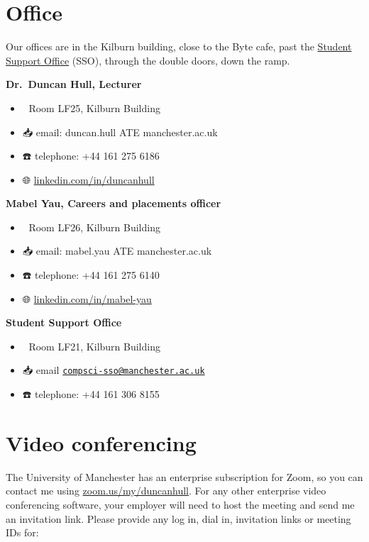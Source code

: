 \documentclass[
  12pt,
]{book}
\providecommand{\tightlist}{%
  \setlength{\itemsep}{0pt}\setlength{\parskip}{0pt}}
\begin{document}
\hypertarget{office}{%
\section{Office}\label{office}}

Our offices are in the Kilburn building, close to the Byte cafe, past the \href{https://studentnet.cs.manchester.ac.uk/student-services/}{Student Support Office} (SSO), through the double doors, down the ramp.

\textbf{Dr.~Duncan Hull, Lecturer} 👨‍💻

\begin{itemize}
\tightlist
\item
  🏢 Room LF25, Kilburn Building
\item
  📥 email: duncan.hull ATE manchester.ac.uk
\item
  ☎️ telephone: +44 161 275 6186
\item
  🌐 \href{https://uk.linkedin.com/in/duncanhull}{linkedin.com/in/duncanhull}
\end{itemize}

\textbf{Mabel Yau, Careers and placements officer} 👩‍💻

\begin{itemize}
\tightlist
\item
  🏢 Room LF26, Kilburn Building
\item
  📥 email: mabel.yau ATE manchester.ac.uk
\item
  ☎️ telephone: +44 161 275 6140
\item
  🌐 \href{https://uk.linkedin.com/in/mabel-yau}{linkedin.com/in/mabel-yau}
\end{itemize}

\textbf{Student Support Office } 👨‍👩‍👧‍👦

\begin{itemize}
\tightlist
\item
  🏢 Room LF21, Kilburn Building
\item
  📥 email \href{mailto:compsci-sso@manchester.ac.uk}{\nolinkurl{compsci-sso@manchester.ac.uk}}
\item
  ☎️ telephone: +44 161 306 8155
\end{itemize}

\hypertarget{video-conferencing}{%
\section{Video conferencing}\label{video-conferencing}}

The University of Manchester has an enterprise subscription for Zoom, so you can contact me using \href{https://zoom.us/my/duncanhull}{zoom.us/my/duncanhull}. For any other enterprise video conferencing software, your employer will need to host the meeting and send me an invitation link. Please provide any log in, dial in, invitation links or meeting IDs for:
\end{document}

